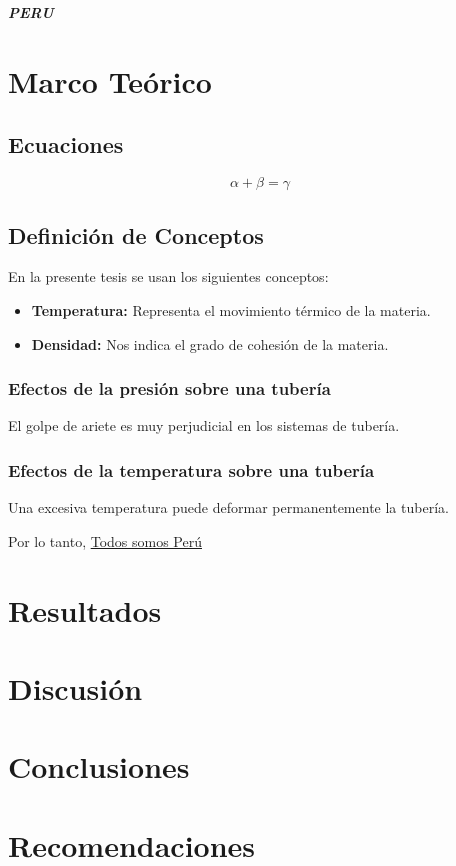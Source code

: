 \documentclass{article}
\begin{document}
\begin{center}
    \textbf{\textit{PERU}}
\end{center}

\section{Marco Te\'orico}

\subsection{Ecuaciones}
\begin{equation}
    \alpha + \beta = \gamma
\end{equation}

\subsection{Definición de Conceptos}
En la presente tesis se usan los siguientes conceptos:
\begin{itemize}
    \item \textbf{Temperatura:} Representa el movimiento térmico de la materia.
    \item \textbf{Densidad:} Nos indica el grado de cohesión de la materia.
\end{itemize}

\subsubsection{Efectos de la presión sobre una tubería}
El golpe de ariete es muy perjudicial en los sistemas de tubería.

\subsubsection{Efectos de la temperatura sobre una tubería}
Una excesiva temperatura puede deformar permanentemente la tubería.

Por lo tanto, \underline{Todos somos Perú}

\section{Resultados}

\section{Discusión}

\section{Conclusiones}

\section{Recomendaciones}
\end{document}
